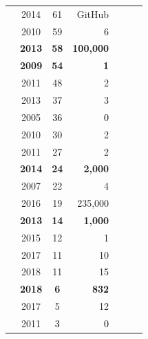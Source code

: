 \documentclass[smallextended]{svjour3}
\newcommand{\cmark}{\ding{51}}%
\newcommand{\xmark}{\ding{55}}%
\begin{document}
\begin{table}
\begin{tabular}{r|@{~}c|@{~}c|@{~}r|@{~}c|@{~}c|@{~}c}
        \cite{lima2014coding} & 2014 &	61 & GitHub  & \xmark & \xmark & \cmark \\
        \cite{Ostrand:2010:PFP:1868328.1868357} & 2010 &	59 &	6  & \xmark & \cmark & \cmark \\
        \rowcolor{blue!10} \textbf{\cite{bissyande2013got}} & \textbf{2013} &	\textbf{58} & \textbf{100,000} & \cmark & \cmark & \xmark \\
       \rowcolor{blue!10}  \textbf{\cite{Abreu:2009:DCF:1595808.1595835}} & \textbf{2009} &	\textbf{54} &	\textbf{1}  & \xmark & \cmark & \cmark \\
        \cite{Jermakovics:2011:MVD:1984642.1984647} & 2011 &	48 &	2  & \xmark & \cmark & \cmark \\
        \cite{bell2} & 2013 &	37 &	3  & \cmark & \cmark & \cmark \\
      \rowcolor{gray!20}  {\cite{wood2005multiview}} &{2005} &	\textcolor{black}{36} &	\textcolor{black}{0} & \xmark & \xmark & \xmark \\
        \cite{Concas:2010:ESS:1945538.1972593} & 2010 &	30 &	2  & \cmark & \xmark & \xmark \\
        \cite{Bicer:2011:DPU:1987875.1987888} & 2011  &	27 &	2 & \xmark & \cmark & \xmark \\
       \rowcolor{blue!10}  \textbf{\cite{jarczyk2014github}} & \textbf{2014} &	\textbf{24} & \textbf{2,000} & \xmark & \cmark & \xmark \\
        \cite{Udaya} & 2007 &	22 &	4  & \cmark & \xmark & \xmark \\
        \cite{7539677} & 2016 &	19 &	235,000  & \cmark & \cmark & \xmark \\
       \rowcolor{blue!10}  \textbf{\cite{Peterson}} & \textbf{2013} &	\textbf{14} & \textbf{1,000} & \xmark & \cmark & \xmark \\
        \cite{Prasad} & 2015 &	12 &	1  & \cmark & \cmark & \xmark \\
        \cite{Kumar2017} & 2017 &	11 &	10  & \cmark & \cmark & \xmark \\
        \cite{jiarpakdee2018impact} & 2018 &	11 &	15  & \cmark & \cmark & \xmark \\
       \rowcolor{blue!10}  \textbf{\cite{Agrawal_2018}} & \textbf{2018} &	\textbf{6} & \textbf{832} & \xmark & \cmark & \xmark \\
        \cite{Gupta2017} & 2017 &	5 &	12   & \cmark & \xmark & \xmark \\
      \rowcolor{gray!20}  {\cite{bier2011online}} &{2011} &	\textcolor{black}{3} &	\textcolor{black}{0} & \xmark & \xmark & \xmark \\

\end{tabular}
\end{table}
\end{document}
